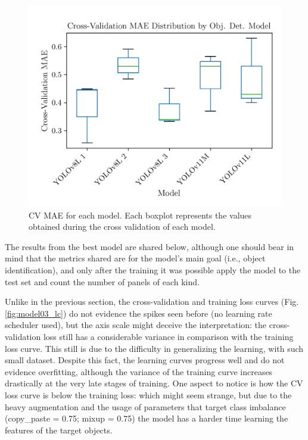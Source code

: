 \documentclass[conference]{IEEEtran}
\begin{document}
\begin{figure}[H]
    \centering
    \includegraphics[width=1\linewidth]{assets/model03_mae_boxplot.png}
    \caption{CV MAE for each model. Each boxplot represents the values obtained during the cross validation of each model.}
    \label{fig:model03_mae_boxplot}
\end{figure}

The results from the best model are shared below, although one should bear in mind that the metrics shared are for the model's main goal (i.e., object identification), and only after the training it was possible apply the model to the test set and count the number of panels of each kind.

Unlike in the previous section, the cross-validation and training loss curves (Fig. \ref{fig:model03_lc}) do not evidence the spikes seen before (no learning rate scheduler used), but the axis scale might deceive the interpretation: the cross-validation loss still has a considerable variance in comparison with the training loss curve. This still is due to the difficulty in generalizing the learning, with such small dataset. Despite this fact, the learning curves progress well and do not evidence overfitting, although the variance of the training curve increases drastically at the very late stages of training. One aspect to notice is how the CV loss curve is below the training loss: which might seem strange, but due to the heavy augmentation and the usage of parameters that target class imbalance (copy\_paste = 0.75; mixup = 0.75) the model has a harder time learning the features of the target objects.
\end{document}
